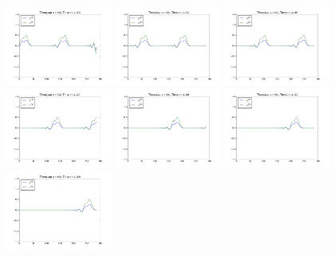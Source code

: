 \documentclass{article} %
\theoremstyle{plain}
\numberwithin{equation}{section} %
\numberwithin{figure}{section} %
\numberwithin{table}{section} %
\begin{document}
\begin{enumerate}[\ \ (a)]
\begin{figure}[ht!]
            \includegraphics[width=0.31\textwidth]{figures/problem_1_b_048.png}
            \includegraphics[width=0.31\textwidth]{figures/problem_1_b_056.png}
            \includegraphics[width=0.31\textwidth]{figures/problem_1_b_064.png}
            \includegraphics[width=0.31\textwidth]{figures/problem_1_b_072.png}
            \includegraphics[width=0.31\textwidth]{figures/problem_1_b_080.png}
            \includegraphics[width=0.31\textwidth]{figures/problem_1_b_088.png}
            \includegraphics[width=0.31\textwidth]{figures/problem_1_b_096.png}

\end{figure}
\end{enumerate}
\end{document}
